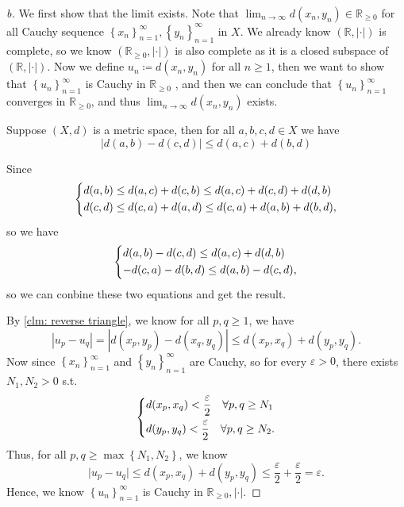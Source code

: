\begin{proof}[b]
  We first show that the limit exists. Note that \(\lim_{n \to \infty} d(x_n, y_n) \in \mathbb{R}_{\ge 0} \) for all Cauchy sequence \(\left\{ x_n \right\}_{n=1}^{\infty} , \left\{ y_n \right\}_{n=1}^{\infty}   \) in \(X\). We already know \((\mathbb{R}, \vert \cdot \vert ) \) is complete, so we know \((\mathbb{R} _{\ge 0}, \vert \cdot \vert )\) is also complete as it is a closed subspace of \((\mathbb{R}, \vert \cdot \vert ) \). Now we define \(u_n \coloneqq d(x_n, y_n)\) for all \(n \ge 1\), then we want to show that \(\left\{ u_n \right\}_{n=1}^{\infty}  \) is Cauchy in \(\mathbb{R}_{\ge 0}\) , and then we can conclude that \(\left\{ u_n \right\}_{n=1}^{\infty}  \) converges in \(\mathbb{R} _{\ge 0}\), and thus \(\lim_{n \to \infty} d(x_n, y_n) \) exists.
 \begin{claim} \label{clm: reverse triangle}
  Suppose \((X, d)\) is a metric space, then for all \(a, b, c, d \in X\) we have 
  \[
    \left\vert d(a, b) - d(c, d) \right\vert \le d(a, c) + d(b, d)
  \]  
 \end{claim}
 \begin{explanation}
    Since
    \[
      \begin{dcases}
        d(a, b) \le d(a, c) + d(c, b) \le d(a, c) + d(c, d) + d(d, b) \\
        d(c, d) \le d(c, a) + d(a, d) \le d(c, a) + d(a, b) + d(b, d),
      \end{dcases}
    \] so we have 
    \[
      \begin{dcases}
        d(a, b) - d(c, d) \le d(a, c) + d(d, b) \\
        -d(c, a) - d(b, d) \le d(a, b) - d(c, d),
      \end{dcases}
    \] so we can conbine these two equations and get the result.
 \end{explanation}
  By \autoref{clm: reverse triangle}, we know for all \(p, q \ge 1\), we have 
  \[
    \left\vert u_p - u_q \right\vert = \left\vert d(x_p, y_p) - d(x_q, y_q) \right\vert \le d(x_p, x_q) + d(y_p, y_q).
  \]  
  Now since \(\left\{ x_n \right\}_{n=1}^{\infty}  \) and \(\left\{ y_n \right\}_{n=1}^{\infty }  \) are Cauchy, so for every \(\varepsilon > 0\), there exists \(N_1, N_2 > 0\) s.t. 
  \[
    \begin{dcases}
      d(x_p, x_q) < \frac{\varepsilon}{2} \quad \forall p, q \ge N_1 \\
      d(y_p, y_q) < \frac{\varepsilon}{2} \quad \forall p, q \ge N_2.
    \end{dcases}
  \]   
  Thus, for all \(p, q \ge \max \left\{ N_1, N_2 \right\} \), we know
  \[
    \vert u_p - u_q \vert \le d(x_p, x_q) + d(y_p, y_q) \le \frac{\varepsilon}{2} + \frac{\varepsilon}{2} = \varepsilon.
  \]
  Hence, we know \(\left\{ u_n \right\}_{n=1}^{\infty}  \) is Cauchy in \(\mathbb{R}_{\ge 0}, \vert \cdot \vert \).  


\end{proof}
